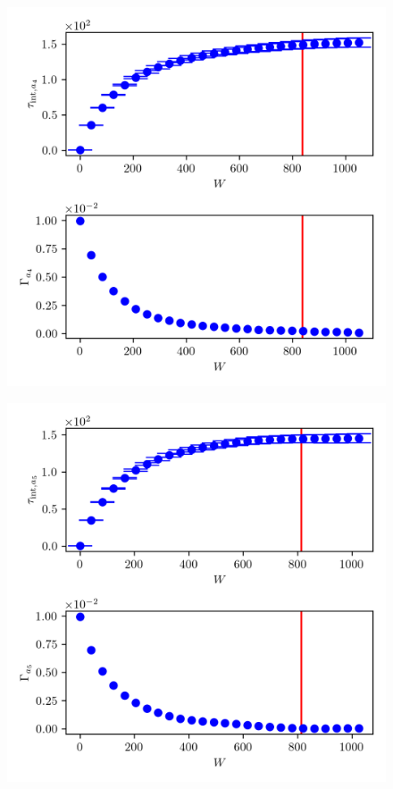 \begin{figure}[ht!]
	\centering
	\includegraphics{UwerrTauIntTWalk10.png}
	\caption[]{}
	\label{fig:}
\end{figure}
\begin{figure}[ht!]
	\centering
	\includegraphics{UwerrTauIntTWalk11.png}
	\caption[]{}
	\label{fig:}
\end{figure}
